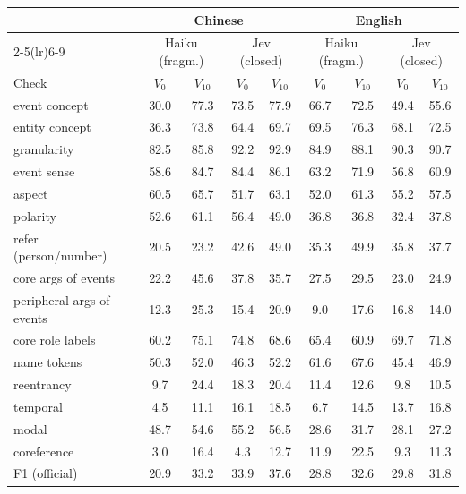 \begin{tabular}{@{}lcccccccc@{}}
\toprule
 & \multicolumn{4}{c}{Chinese} & \multicolumn{4}{c}{English} \\
\cmidrule(lr){2-5}\cmidrule(lr){6-9}
 & \multicolumn{2}{c}{Haiku (fragm.)} & \multicolumn{2}{c}{Jev (closed)} & \multicolumn{2}{c}{Haiku (fragm.)} & \multicolumn{2}{c}{Jev (closed)} \\
Check & $V_0$ & $V_{10}$ & $V_0$ & $V_{10}$ & $V_0$ & $V_{10}$ & $V_0$ & $V_{10}$ \\
\midrule
event concept & 30.0 & 77.3 & 73.5 & 77.9 & 66.7 & 72.5 & 49.4 & 55.6 \\
entity concept & 36.3 & 73.8 & 64.4 & 69.7 & 69.5 & 76.3 & 68.1 & 72.5 \\
granularity & 82.5 & 85.8 & 92.2 & 92.9 & 84.9 & 88.1 & 90.3 & 90.7 \\
event sense & 58.6 & 84.7 & 84.4 & 86.1 & 63.2 & 71.9 & 56.8 & 60.9 \\
aspect & 60.5 & 65.7 & 51.7 & 63.1 & 52.0 & 61.3 & 55.2 & 57.5 \\
polarity & 52.6 & 61.1 & 56.4 & 49.0 & 36.8 & 36.8 & 32.4 & 37.8 \\
refer (person/number) & 20.5 & 23.2 & 42.6 & 49.0 & 35.3 & 49.9 & 35.8 & 37.7 \\
core args of events & 22.2 & 45.6 & 37.8 & 35.7 & 27.5 & 29.5 & 23.0 & 24.9 \\
peripheral args of events & 12.3 & 25.3 & 15.4 & 20.9 & 9.0 & 17.6 & 16.8 & 14.0 \\
core role labels & 60.2 & 75.1 & 74.8 & 68.6 & 65.4 & 60.9 & 69.7 & 71.8 \\
name tokens & 50.3 & 52.0 & 46.3 & 52.2 & 61.6 & 67.6 & 45.4 & 46.9 \\
reentrancy & 9.7 & 24.4 & 18.3 & 20.4 & 11.4 & 12.6 & 9.8 & 10.5 \\
temporal & 4.5 & 11.1 & 16.1 & 18.5 & 6.7 & 14.5 & 13.7 & 16.8 \\
modal & 48.7 & 54.6 & 55.2 & 56.5 & 28.6 & 31.7 & 28.1 & 27.2 \\
coreference & 3.0 & 16.4 & 4.3 & 12.7 & 11.9 & 22.5 & 9.3 & 11.3 \\
\midrule
\jm{} F1 (official) & 20.9 & 33.2 & 33.9 & 37.6 & 28.8 & 32.6 & 29.8 & 31.8 \\
\bottomrule
\end{tabular}
